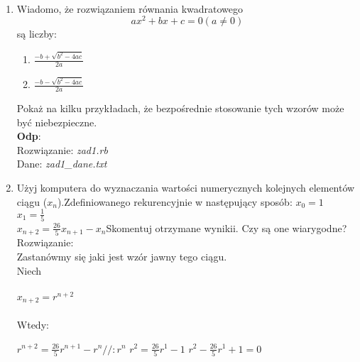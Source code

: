 \documentclass[fleqn]{article}
\author{Michał Bronikowski}
\begin{document}
\hfill
\\
\begin{enumerate}
   \item Wiadomo, że rozwiązaniem równania kwadratowego \[ax^{2}+bx+c=0 (a\neq 0)\] są liczby:
   
      \begin{enumerate}
	 \item $\frac{-b+\sqrt{b^{2}-4ac}}{2a}$
	 \item $\frac{-b-\sqrt{b^{2}-4ac}}{2a}$
      \end{enumerate}
      Pokaż na kilku przykładach, że bezpośrednie stosowanie tych wzorów może być niebezpieczne.\\ 
      \textbf{Odp}:\\
      Rozwiązanie: \emph{zad1.rb}\\
      Dane: \emph{zad1\_dane.txt}\\
   \item Użyj komputera do wyznaczania wartości numerycznych kolejnych elementów ciągu ($x_{n}$).Zdefiniowanego rekurencyjnie w następujący sposób:\newline \newline
   $x_{0} = 1$\\
   $x_{1} = \frac{1}{5}$\\
   $x_{n + 2} =\frac{26}{5}x_{n+1}-x_n$\newline \newline Skomentuj otrzymane wynikii. Czy są one wiarygodne?\\ 
   Rozwiązanie:\\
   Zastanówmy się jaki jest wzór jawny tego ciągu.\\
   Niech \\ \\ $x_{n+2} = r^{n+2}$ \\ \\ Wtedy:\\ \newline
   \begin{center}
   $ r^{n+2} = \frac{26}{5}r^{n+1} - r^{n}  // :r^{n}$\newline\newline
   $r^{2} = \frac{26}{5}r^{1} - 1 $\newline\newline
   $r^{2} -\frac{26}{5}r^{1} + 1 = 0 $\newline\newline

\end{center}
\end{enumerate}
\end{document}
